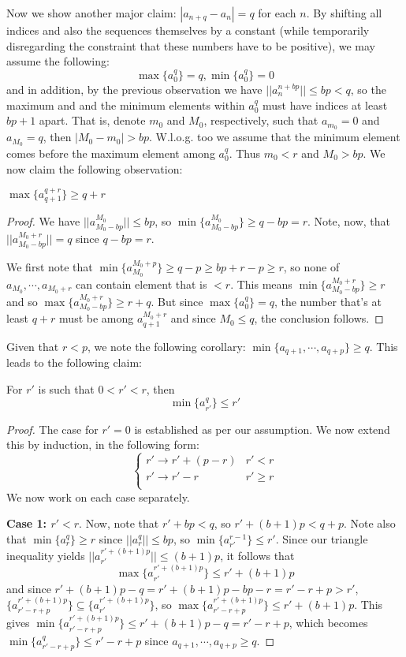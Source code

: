 \documentclass[11pt,a4paper]{article}
\begin{document}
\begin{enumerate}
		Now we show another major claim: 
		$|a_{n+q}-a_n|=q$ for each $n$. 
		By shifting all indices and also the sequences themselves by a constant (while temporarily disregarding the constraint that these numbers have to be positive), we may assume the following: 
		\[
		\max\{a_0^q\}=q, \min\{a_0^q\} = 0
		\]
		and in addition, by the previous observation we have $||a_n^{n+bp}||\le bp < q$, 
		so the maximum and and the minimum elements within $a_0^q$ must have indices at least $bp+1$ apart. 
		That is, denote $m_0$ and $M_0$, respectively, 
		such that $a_{m_0}=0$ and $a_{M_0}=q$, 
		then $|M_0-m_0|>bp$. 
		W.l.o.g. too we assume that the minimum element comes before the maximum element among $a_0^q$. 
		Thus $m_0<r$ and $M_0 > bp$. 
		We now claim the following observation: 
		\begin{lemma}
			$\max\{a_{q+1}^{q+r}\}\ge q + r$
		\end{lemma}
		\begin{proof}
			We have $||a_{M_0-bp}^{M_0}||\le bp$, 
			so $\min\{a_{M_0-bp}^{M_0}\}\ge q - bp = r$. 
			Note, now, that 
			$||a_{M_0-bp}^{M_0+r}||=q$ since $q-bp=r$. 
			
			We first note that $\min\{a_{M_0}^{M_0+p}\}\ge q - p\ge bp+r-p\ge r$, 
			so none of $a_{M_0}, \cdots, a_{M_0+r}$ can contain element that is $< r$. 
			This means $\min\{a_{M_0-bp}^{M_0+r}\}\ge r$
			and so 
			$\max \{a_{M_0-bp}^{M_0+r}\}\ge r + q$. 
			But since $\max\{a_0^q\}=q$, 
			the number that's at least $q + r$ must be among 
			$a_{q+1}^{M_0+r}$ and since $M_0\le q$, 
			the conclusion follows. 
		\end{proof}
		Given that $r < p$, we note the following corollary: 
		$\min\{a_{q+1}, \cdots, a_{q+p}\}\ge q$. 
		This leads to the following claim: 
		\begin{lemma}
			For $r'$ is such that $0 < r' < r$, then 
			\[
			\min\{a_{r'}^{q}\}\le r'
			\]
		\end{lemma}
		\begin{proof}
			The case for $r' = 0$ is established as per our assumption. 
			We now extend this by induction, in the following form: 
			\[
			\begin{cases}
				r'\to r'+(p-r) & r' < r\\
				r'\to r' - r & r'\ge r\\
			\end{cases}
			\]
			We now work on each case separately. 
			
			\textbf{Case 1: $r' < r$}. 
			Now, note that $r' + bp < q$, so 
			$r' + (b+1)p < q + p$. 
			Note also that $\min\{a_{r}^q\}\ge r$ since $||a_r^q||\le bp$, 
			so $\min\{a_{r'}^{r-1}\}\le r'$. 
			Since our triangle inequality yields 
			$||a_{r'}^{r'+(b+1)p}||\le (b+1)p$, 
			it follows that 
			\[
			\max\{a_{r'}^{r'+(b+1)p}\}\le r' + (b+1)p
			\]
			and since $r'+(b+1)p - q = r'+(b+1)p-bp-r = r'-r+p > r'$, 
			$\{a_{r'-r+p}^{r'+(b+1)p}\}\subseteq \{a_{r'}^{r'+(b+1)p}\}$, so 
			$\max\{a_{r'-r+p}^{r'+(b+1)p}\}\le r' + (b+1)p$. 
			This gives 
			$\min\{a_{r'-r+p}^{r'+(b+1)p}\}\le r' + (b+1)p - q = r'-r+p$, 
			which becomes $\min\{a_{r'-r+p}^{q}\}\le r'-r+p$ since $a_{q+1}, \cdots, a_{q+p}\ge q$. 
			

\end{proof}
\end{enumerate}
\end{document}
